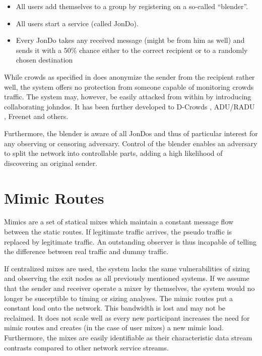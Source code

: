 \begin{itemize}
	\item All users add themselves to a group by registering on a so-called ``blender''.
	\item All users start a service (called JonDo).
	\item Every JonDo takes any received message (might be from him as well) and sends it with a 50\% chance either to the correct recipient or to a randomly chosen destination
\end{itemize}

While crowds as specified in \cite{crowds:tissec} does anonymize the sender from the recipient rather well, the system offers no protection from someone capable of monitoring crowds traffic. The system may, however, be easily attacked from within by introducing collaborating johndos. It has been further developed to D-Crowds \cite{DBLP:conf/esorics/DanezisDKT09}, ADU/RADU \cite{Munoz-Gea2008}, Freenet\cite{freenet} and others. 

Furthermore, the blender is aware of all JonDos and thus of particular interest for any observing or censoring adversary. Control of the blender enables an adversary to split the network into controllable parts, adding a high likelihood of discovering an original sender.

\section{Mimic Routes}
Mimics are a set of statical mixes which maintain a constant message flow between the static routes. If legitimate traffic arrives, the pseudo traffic is replaced by legitimate traffic. An outstanding observer is thus incapable of telling the difference between real traffic and dummy traffic.

If centralized mixes are used, the system lacks the same vulnerabilities of sizing and observing the exit nodes as all previously mentioned systems. If we assume that the sender and receiver operate a mixer by themselves, the system would no longer be susceptible to timing or sizing analyses. The mimic routes put a constant load onto the network. This bandwidth is lost and may not be reclaimed. It does not scale well as every new participant increases the need for mimic routes and creates (in the case of user mixes) a new mimic load. Furthermore, the mixes are easily identifiable as their characteristic data stream contrasts compared to other network service streams.

